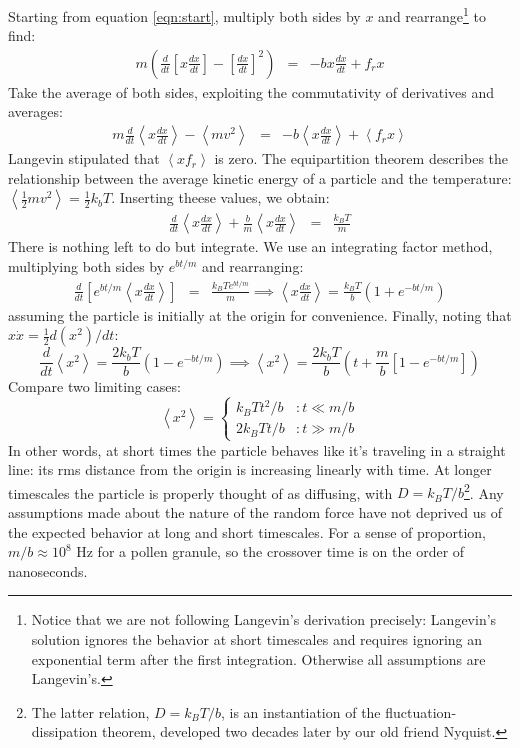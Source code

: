 \documentclass{article}
\begin{document}
Starting from equation \ref{eqn:start}, multiply both sides by $x$ and rearrange\footnote{Notice that we are not following Langevin's derivation precisely: Langevin's solution ignores the behavior at short timescales and requires ignoring an exponential term after the first integration. Otherwise all assumptions are Langevin's. } to find:
 \begin{eqnarray*}
m \left( \frac{d}{dt} \left[ x \frac{dx}{dt} \right] - \left[ \frac{dx}{dt} \right]^2 \right) & = & - b x \frac{dx}{dt} + f_r x
\end{eqnarray*}
Take the average of both sides, exploiting the commutativity of derivatives and averages:
 \begin{eqnarray*}
m \frac{d}{dt} \left< x \frac{dx}{dt} \right> - \left< mv^2 \right> & = & - b \left< x \frac{dx}{dt} \right> + \left< f_r x \right>
\end{eqnarray*}
Langevin stipulated that $\left< x f_r \right>$ is zero. The equipartition theorem describes the relationship between the average kinetic energy of a particle and the temperature: $\left< \frac{1}{2} mv^2 \right> = \frac{1}{2}k_b T$. Inserting theese values, we obtain:
 \begin{eqnarray*}
 \frac{d}{dt} \left< x \frac{dx}{dt} \right> + \frac{b}{m} \left< x \frac{dx}{dt} \right>  & = & \frac{k_B T}{m}
\end{eqnarray*}
There is nothing left to do but integrate. We use an integrating factor method, multiplying both sides by $e^{bt/m}$ and rearranging:
 \begin{eqnarray*}
 \frac{d}{dt} \left[ e^{bt/m} \left< x \frac{dx}{dt} \right> \right]  & = & \frac{k_B Te^{bt/m}}{m} \implies  \left< x \frac{dx}{dt} \right> = \frac{k_B T}{b} \left( 1 + e^{-bt/m} \right)
\end{eqnarray*}
assuming the particle is initially at the origin for convenience. Finally, noting that $x \dot{x} =  \frac{1}{2} d(x^2)/dt$:
\[ \frac{d}{dt} \left< x^2 \right> = \frac{2 k_b T}{b} \left( 1 - e^{-bt/m} \right) \implies \left< x^2 \right>  = \frac{2 k_b T }{b} \left(t + \frac{m}{b} \left[  1 - e^{-bt/m} \right] \right)  \]
Compare two limiting cases:
\[ \left< x^2 \right> = \left\{
     \begin{array}{lr}
       k_B T t^2/b & : t \ll m/b \\
       2k_BTt/b & : t \gg m/b
     \end{array}
   \right. \]
In other words, at short times the particle behaves like it's traveling in a straight line: its rms distance from the origin is increasing linearly with time. At longer timescales the particle is properly thought of as diffusing, with $D=k_BT/b$\footnote{The latter relation, $D=k_BT/b$, is an instantiation of the fluctuation-dissipation theorem, developed two decades later by our old friend Nyquist.}. Any assumptions made about the nature of the random force have not deprived us of the expected behavior at long and short timescales. For a sense of proportion, $m/b \approx 10^{8}$ Hz for a pollen granule, so the crossover time is on the order of nanoseconds.\\
\end{document}

